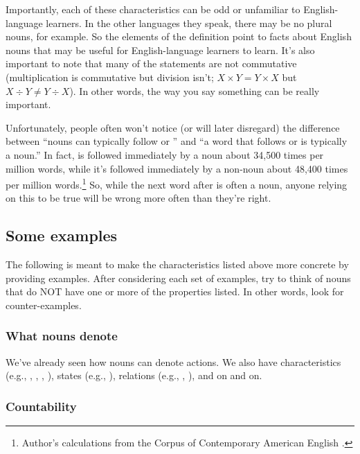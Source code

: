 Importantly, each of these characteristics can be odd or unfamiliar to English-language learners. In the other languages they speak, there may be no plural nouns, for example. So the elements of the definition point to facts about English nouns that may be useful for English-language learners to learn. It's also important to note that many of the statements are not commutative (multiplication is commutative but division isn't; $X \times Y = Y \times X$ but $X \div Y \neq Y \div X$). In other words, the way you say something can be really important. 

Unfortunately, people often won't notice (or will later disregard) the difference between \enquote{nouns can typically follow  or } and \enquote{a word that follows  or  is typically a noun.} In fact,  is followed immediately by a noun about 34,500 times per million words, while it's followed immediately by a non-noun about 48,400 times per million words.\footnote{Author's calculations from the Corpus of Contemporary American English \citep{COCA}.} So, while the next word after  is often a noun, anyone relying on this to be true will be wrong more often than they're right.

\subsection{Some examples}\label{sec:examples}
The following is meant to make the characteristics listed above more concrete by providing examples. After considering each set of examples, try to think of nouns that do NOT have one or more of the properties listed. In other words, look for counter-examples.


\subsubsection*{What nouns denote}
We've already seen how nouns can denote actions. We also have characteristics (e.g., , , , ), states (e.g., ), relations (e.g., , ), and on and on.

\subsubsection*{Countability}

